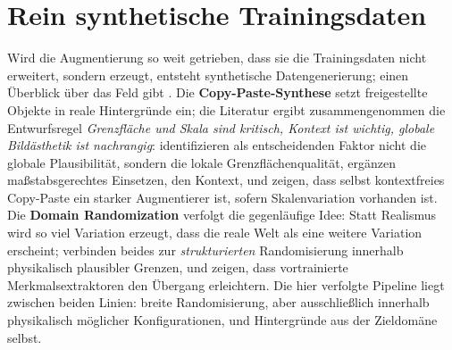 \section{Rein synthetische Trainingsdaten}
\label{sec:augsynthese}

Wird die Augmentierung so weit getrieben, dass sie die Trainingsdaten nicht
erweitert, sondern erzeugt, entsteht synthetische Datengenerierung; einen
Überblick über das Feld gibt \textcite{nikolenko2021}. Die
\textbf{Copy-Paste-Synthese} setzt freigestellte Objekte in reale Hintergründe
ein; die Literatur ergibt zusammengenommen die Entwurfsregel
\emph{Grenzfläche und Skala sind kritisch, Kontext ist wichtig, globale
Bildästhetik ist nachrangig}: \textcite{dwibedi2017} identifizieren als
entscheidenden Faktor nicht die globale Plausibilität, sondern die lokale
Grenzflächenqualität, \textcite{georgakis2017} ergänzen maßstabsgerechtes
Einsetzen, \textcite{dvornik2018} den Kontext, und \textcite{ghiasi2021} zeigen,
dass selbst kontextfreies Copy-Paste ein starker Augmentierer ist, sofern
Skalenvariation vorhanden ist. Die \textbf{Domain Randomization}
\parencite{tobin2017,tremblay2018} verfolgt die gegenläufige Idee: Statt
Realismus wird so viel Variation erzeugt, dass die reale Welt als eine weitere
Variation erscheint; \textcite{prakash2019} verbinden beides zur
\emph{strukturierten} Randomisierung innerhalb physikalisch plausibler Grenzen,
und \textcite{hinterstoisser2018} zeigen, dass vortrainierte Merkmalsextraktoren
den Übergang erleichtern. Die hier verfolgte Pipeline liegt zwischen beiden
Linien: breite Randomisierung, aber ausschließlich innerhalb physikalisch
möglicher Konfigurationen, und Hintergründe aus der Zieldomäne selbst.

